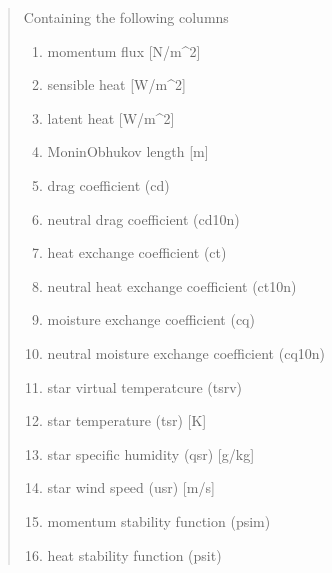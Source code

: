 \documentclass[letterpaper,10pt,english]{sphinxmanual}
\begin{document}
\begin{fulllineitems}
\begin{quote}
\begin{description}
\begin{itemize}
\end{itemize}

\sphinxAtStartPar

\sphinxAtStartPar
{} \textendash{} Containing the following columns
\begin{enumerate}
%
\item {}
\sphinxAtStartPar
momentum flux       {[}N/m\textasciicircum{}2{]}

\item {}
\sphinxAtStartPar
sensible heat       {[}W/m\textasciicircum{}2{]}

\item {}
\sphinxAtStartPar
latent heat         {[}W/m\textasciicircum{}2{]}

\item {}
\sphinxAtStartPar
Monin\sphinxhyphen{}Obhukov length {[}m{]}

\item {}
\sphinxAtStartPar
drag coefficient (cd)

\item {}
\sphinxAtStartPar
neutral drag coefficient (cd10n)

\item {}
\sphinxAtStartPar
heat exchange coefficient (ct)

\item {}
\sphinxAtStartPar
neutral heat exchange coefficient (ct10n)

\item {}
\sphinxAtStartPar
moisture exchange coefficient (cq)

\item {}
\sphinxAtStartPar
neutral moisture exchange coefficient (cq10n)

\item {}
\sphinxAtStartPar
star virtual temperatcure (tsrv)

\item {}
\sphinxAtStartPar
star temperature (tsr) {[}K{]}

\item {}
\sphinxAtStartPar
star specific humidity (qsr) {[}g/kg{]}

\item {}
\sphinxAtStartPar
star wind speed (usr) {[}m/s{]}

\item {}
\sphinxAtStartPar
momentum stability function (psim)

\item {}
\sphinxAtStartPar
heat stability function (psit)


\end{enumerate}
\end{description}
\end{quote}
\end{fulllineitems}
\end{document}
